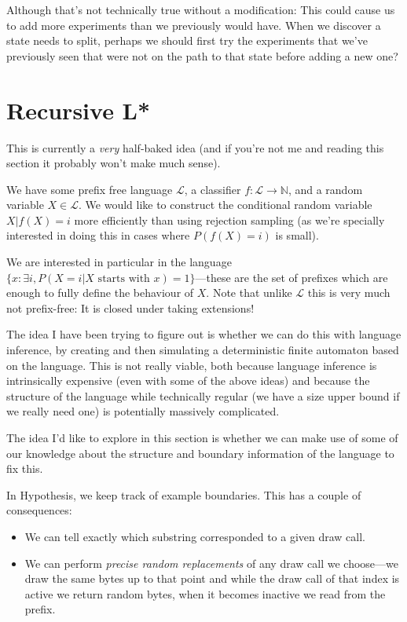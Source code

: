 \documentclass[a4paper]{book}
\begin{document}
Although that's not technically true without a modification:
This could cause us to add more experiments than we previously would have.
When we discover a state needs to split,
perhaps we should first try the experiments that we've previously seen that were not on the path to that state before adding a new one?

\section{Recursive L*}

This is currently a \emph{very} half-baked idea (and if you're not me and reading this section it probably won't make much sense).

We have some prefix free language \(\mathcal{L}\), a classifier \(f: \mathcal{L} \to \mathbb{N}\),
and a random variable \(X \in \mathcal{L}\).
We would like to construct the conditional random variable \(X|f(X) = i\) more efficiently than using rejection sampling
(as we're specially interested in doing this in cases where \(P(f(X) = i)\) is small).

We are interested in particular in the language \(\{x: \exists i, P(X = i|X \text{ starts with } x) = 1\}\)---these
are the set of prefixes which are enough to fully define the behaviour of \(X\).
Note that unlike \(\mathcal{L}\) this is very much not prefix-free:
It is closed under taking extensions!

The idea I have been trying to figure out is whether we can do this with language inference,
by creating and then simulating a deterministic finite automaton based on the language.
This is not really viable,
both because language inference is intrinsically expensive (even with some of the above ideas) and because the structure of the language while technically regular (we have a size upper bound if we really need one) is potentially massively complicated.

The idea I'd like to explore in this section is whether we can make use of some of our knowledge about the structure and boundary information of the language to fix this.

In Hypothesis,
we keep track of example boundaries.
This has a couple of consequences:

\begin{itemize}
\item We can tell exactly which substring corresponded to a given draw call.
\item We can perform \emph{precise random replacements} of any draw call we choose---we
draw the same bytes up to that point and while the draw call of that index is active we return random bytes,
when it becomes inactive we read from the prefix.
\end{itemize}
\end{document}
